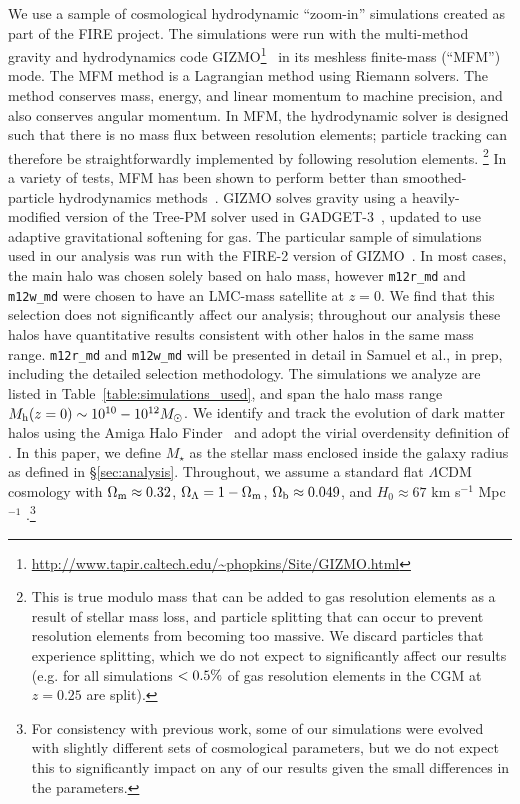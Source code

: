 \documentclass[fleqn,usenatbib]{mnras}
\begin{document}
We use a sample of cosmological hydrodynamic ``zoom-in'' simulations created as part of the FIRE project.
The simulations were run with the multi-method gravity and hydrodynamics code \textsc{GIZMO}\footnote{\url{http://www.tapir.caltech.edu/\~phopkins/Site/GIZMO.html}}~\citep{Hopkins2015} in its meshless finite-mass (``MFM'') mode.
The MFM method is a Lagrangian method using Riemann solvers.
The method conserves mass, energy, and linear momentum to machine precision, and also conserves angular momentum. 
In MFM, the hydrodynamic solver is designed such that there is no mass flux between resolution elements; particle tracking can therefore be straightforwardly implemented by following resolution elements. 
\footnote{This is true modulo mass that can be added to gas resolution elements as a result of stellar mass loss, and particle splitting that can occur to prevent resolution elements from becoming too massive.
We discard particles that experience splitting, which we do not expect to significantly affect our results (e.g. for all simulations $<0.5\%$ of gas resolution elements in the CGM at $z=0.25$ are split).} 
In a variety of tests, MFM has been shown to perform better than smoothed-particle hydrodynamics methods~\citep{Hopkins2015}.
\textsc{GIZMO} solves gravity using a heavily-modified version of the Tree-PM solver used in \textsc{GADGET-3}~\citep{Springel2005}, updated to use adaptive gravitational softening for gas. 
The particular sample of simulations used in our analysis was run with the FIRE-2 version of GIZMO~\citep{Hopkins2017}. 
In most cases, the main halo was chosen solely based on halo mass, however \texttt{m12r\_md} and \texttt{m12w\_md} were chosen to have an LMC-mass satellite at $z=0$.
We find that this selection does not significantly affect our analysis; 
throughout our analysis these halos have quantitative results consistent with other halos in the same mass range.
\texttt{m12r\_md} and \texttt{m12w\_md} will be presented in detail in Samuel et al., in prep, including the detailed selection methodology. 
The simulations we analyze are listed in Table~\ref{table:simulations_used}, and span the halo mass range $M_{\rm h}(z=0) \sim 10^{10} - 10^{12} M_\odot$. 
We identify and track the evolution of dark matter halos using the Amiga Halo Finder~\citep[AHF;][]{Gill2004,Knollmann2009} and adopt the virial overdensity definition of \cite{Bryan1998}.
In this paper, we define $M_{\star}$ as the stellar mass enclosed inside the galaxy radius as defined in \S\ref{sec:analysis}. 
Throughout, we assume a standard flat $\Lambda$CDM cosmology with $\Omega_{\rm m }\approx 0.32$, $\Omega_{\Lambda}=1-\Omega_{\rm m}$, $\Omega_{\rm b} \approx 0.049$, and $H_{0} \approx 67$ km s$^{-1}$ Mpc$^{-1}$ \citep[e.g.,][]{PlanckCollaboration2018}.\footnote{For consistency with previous work, some of our simulations were evolved with slightly different sets of cosmological parameters, but we do not expect this to significantly impact on any of our results given the small differences in the parameters.}
\end{document}
